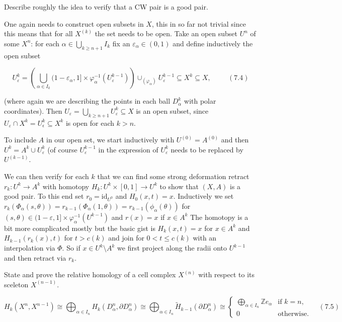 Describe roughly the idea to verify that a CW pair is a good pair.

One again needs to construct open subsets in \( X \), this in so far not trivial
since this means that for all \( X^{(k)} \) the set needs to be open.
Take an open subset \(U^n\) of some \(X^n\): 
for each \(\alpha \in \bigcup_{k \geq n+1} I_k\) fix an \(\varepsilon_\alpha \in (0,1)\) and define inductively the open subset

\[ U_\varepsilon^k = \left( \bigcup_{\alpha \in I_k} (1-\varepsilon_\alpha, 1] \times \varphi_\alpha^{-1} (U_\varepsilon^{k-1}) \right) \cup_{(\varphi_\alpha)} U_\varepsilon^{k-1} \subseteq X^k \subseteq X, \hspace{1cm} (7.4) \]

(where again we are describing the points in each ball \(D^k_\alpha\) with polar coordinates). 
Then \(U_\varepsilon = \bigcup_{k \geq n+1} U_\varepsilon^k \subseteq X\) is an open subset, since \(U_\varepsilon \cap X^k = U_\epsilon^k \subseteq X^k\) is open for 
each \(k > n\).

To include \( A \) in our open set, we start inductively with \( U^{(0)} = A^{(0)} \) and then \( U^{k} = A^k \cup U_\varepsilon^k \) (of course
\(U_\varepsilon^{k-1}\) in the expression of \( U_\varepsilon^k \) needs to be replaced by \( U^{(k-1)} \).

We can then verify for each \( k \) that we can find some strong deformation retract \( r_k : U^k \to A^k \) with homotopy \( H_k : U^k \times [0, 1] \to U^k \)
to show that \( (X, A) \) is a good pair. To this end set \( r_0 = \text{id}_{U^0} \) and \( H_0(x, t) = x \). 
Inductively we set
\( r_k(\Phi_\alpha(s, \theta)) = r_{k-1}(\Phi_\alpha(1, \theta)) = r_{k-1}(\phi_\alpha(\theta)) \)
for \( (s, \theta) \in (1 - \varepsilon, 1] \times \varphi_\alpha^{-1}(U^{k-1}) \) and \( r(x) = x \) if \( x \in A^k \)
The homotopy is a bit more complicated mostly but the basic gist is \( H_k(x, t) = x \) for \( x \in A^k \) and \( H_{k-1}(r_k(x), t) \) for \( t > c(k) \)
and join for \( 0 < t \leq c(k) \) with an interpolation via \( \Phi \).
So if \( x \in U^k \setminus A^k \) we first project along the radii onto \( U^{k-1} \) and then retract via \( r_k \).

State and prove the relative homology of a cell complex \( X^{(n)} \) with respect to its sceleton \( X^{(n-1)} \).

\[
H_k(X^n, X^{n-1}) \cong \bigoplus_{\alpha \in I_n} H_k(D^n_\alpha, \partial D^n_\alpha) 
\cong \bigoplus_{\alpha \in I_n} \tilde{H}_{k-1} (\partial D^n_\alpha) 
\cong 
\begin{cases}
\bigoplus_{\alpha \in I_n} \mathbb{Z} e_\alpha & \text{if } k = n, \\
0 & \text{otherwise.}
\end{cases}
\quad (7.5)
\]

